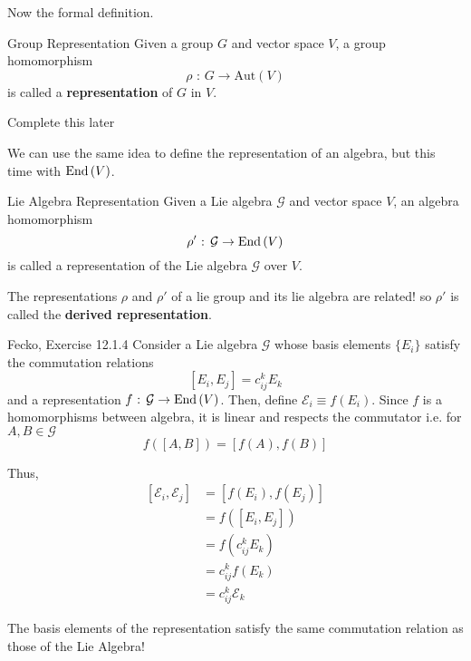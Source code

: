 \documentclass[11pt]{article}
\begin{document}
\vskip 0.5cm
Now the formal definition.

\vskip 0.5cm
\begin{definition}{Group Representation}
  Given a group $G$ and vector space $V$, a group homomorphism \[ \rho \text{ : } G \rightarrow \mathrm{Aut}(V) \] is called a \textbf{representation} of $G$ in $V$.
\end{definition}

\begin{example}
  Complete this later
\end{example}

\vskip 0.5cm

We can use the same idea to define the representation of an algebra, but this time with $\mathrm{End}\left(V\right)$.

\begin{definition}{Lie Algebra Representation}
  Given a Lie algebra $\mathcal{G}$ and vector space $V$, an algebra homomorphism \[ \rho' \text{ : } \mathcal{G} \rightarrow \mathrm{End}\left(V\right) \] is called a representation of the Lie algebra $\mathcal{G}$ over $V$.
\end{definition}

\begin{remark}{The representations $\rho$ and $\rho'$ of a lie group and its lie algebra are related! so $\rho'$ is called the \textbf{derived representation}.}
\end{remark}

\begin{ex}{Fecko, Exercise 12.1.4}
    Consider a Lie algebra $\mathcal{G}$ whose basis elements $\{E_i\}$ satisfy the commutation relations 
    \[ [E_i, E_j] = c^k_{ij} E_k  \]
    and a representation $f \text{ : } \mathcal{G} \rightarrow \mathrm{End}\left(V\right)$. Then, define $\mathcal{E}_i \equiv f(E_i)$. Since $f$ is a homomorphisms between algebra, it is linear and respects the commutator i.e. for $A, B \in \mathcal{G}$
    \[ f\left( [A, B] \right) = \left[f(A), f(B)\right] \] 

    Thus, 
    \begin{align*}
      \left[ \mathcal{E}_i, \mathcal{E}_j \right] &= \left[f(E_i), f(E_j) \right] \\
      &= f\left([E_i, E_j]\right) \\
      &= f\left(c^k_{ij} E_k\right) \\
      &= c^{k}_{ij} f(E_k) \\
      &= c^{k}_{ij} \mathcal{E}_k 
    \end{align*}

    \begin{thought}{The basis elements of the representation satisfy the same commutation relation as those of the Lie Algebra!}
    \end{thought}
\end{ex}
\end{document}
